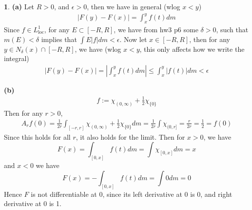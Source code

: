 \documentclass[10.5pt]{article}
\theoremstyle{definition}
\newtheorem{pb}{}
\newcommand{\set}[1]{\{#1\}}
\newcommand{\abs}[1]{\left\vert#1\right\vert}
\begin{document}
    \begin{pb}
        \textbf{(a)} Let \(R > 0\), and \(\epsilon > 0\), then we have in general (wlog \(x < y\))
        \begin{align*}
            \abs{F(y) - F(x)} = \int_x^y f(t)dm
        \end{align*}
        Since \(f \in L^1_{\text{loc}}\), for any \(E \subset [-R,R]\), we have from hw3 p6 some \(\delta > 0\), such
        that \(m(E) < \delta\) implies that \(\int{E}\abs{f} dm < \epsilon\). Now let \(x \in [-R,R]\), then for any
        \(y \in N_\delta(x)\cap[-R,R]\), we have (wlog \(x < y\), this only affects how we write the integral)
        \begin{align*}
            \abs{F(y) - F(x)} = \abs{\int_x^y f(t)dm} \leq \int_x^y \abs{f(t)}dm < \epsilon
        \end{align*}

        \textbf{(b)}
        \begin{align*}
            f := \chi_{(0,\infty)} + \frac12 \chi_{\set{0}}
        \end{align*}
        Then for any \(r > 0\),
        \begin{align*}
            A_rf(0) = \frac{1}{2r}\int_{[-r,r]} \chi_{(0,\infty)} + \frac12 \chi_{\set{0}} dm
            = \frac{1}{2r}\int \chi_{(0,r]} = \frac{r}{2r} = \frac12 = f(0)
        \end{align*}
        Since this holds for all \(r\), it also holds for the limit.
        Then for \(x > 0\), we have 
        \[F(x) = \int_{[0,x]}f(t)dm = \int \chi_{[0,x]}dm = x\]
        and \(x < 0\) we have
        \[F(x) = -\int_{[0,x]}f(t)dm = \int 0 dm = 0\]
        Hence \(F\) is not differentiable at \(0\), since its left derivative at \(0\) is \(0\), and right derivative at \(0\) is 1.
        

\end{pb}
\end{document}
